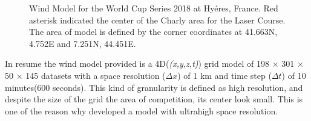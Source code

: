 
\begin{figure} [hb!]
  \centering
  \caption{Wind Model for the World Cup Series 2018 at Hyéres, France. Red asterisk indicated the center of the Charly area for the Laser Course. The area of model is defined by the corner coordinates at 41.663\degree N, 4.752\degree E and 7.251\degree N, 44.451\degree E.}
\label{fig:wind_model_FR} 
\end{figure}
In resume the wind model provided is a 4D(\textit{(x,y,z,t)}) grid model of 198 $\times$ 301 $\times$ 50 $\times$ 145 datasets with a space resolution ($\Delta x$) of 1 km and time step ($\Delta t$) of 10 minutes(600 seconds). This kind of granularity is defined as high resolution, and despite the size of the grid the area of competition, its center look small. This is one of the reason why \cite{giannaros2018ultrahigh} developed a model with ultrahigh space resolution.\par  


